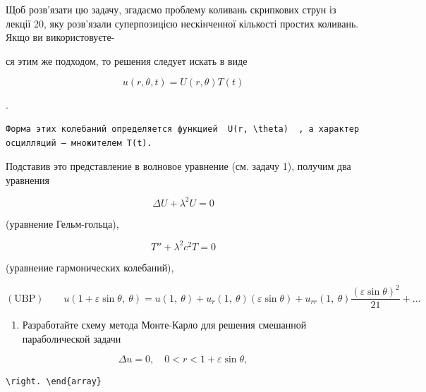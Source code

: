 \documentclass[
  ukrainian,
]{article}
\providecommand{\tightlist}{%
  \setlength{\itemsep}{0pt}\setlength{\parskip}{0pt}}
\begin{document}
Щоб розв'язати цю задачу, згадаємо проблему коливань скрипкових струн із
лекції 20, яку розв'язали суперпозицією нескінченної кількості простих
коливань. Якщо ви використовуєте-

ся этим же подходом, то решения следует искать в виде

\[
u(r, \theta, t) = U(r, \theta) T(t)
\]

.

\begin{verbatim}
Форма этих колебаний определяется функцией  U(r, \theta)  , а характер осцилляций — множителем T(t).
\end{verbatim}

Подставив это представление в волновое уравнение (см. задачу 1), получим
два уравнения

\[
\Delta U + \lambda^2 U = 0
\]

(уравнение Гельм-гольца),

\[
T'' + \lambda^2 c^2 T = 0
\]

(уравнение гармонических колебаний),

\[
(\text{UBP}) \qquad
u(1+\varepsilon\sin\theta,\ \theta)=u(1,\ \theta)+u_r(1,\ \theta)(\varepsilon\sin\theta)+u_{rr}(1,\ \theta)\frac{(\varepsilon\sin\theta)^2}{21}+\ldots
\]

\begin{enumerate}
\def\labelenumi{\arabic{enumi}.}
\setcounter{enumi}{4}
\tightlist
\item
  Разработайте схему метода Монте-Карло для решения смешанной
  параболической задачи
\end{enumerate}

\[
\Delta u = 0, \quad 0 < r < 1 + \varepsilon \sin \theta,
\]

\begin{verbatim}
\right. \end{array}
\end{verbatim}
\end{document}
